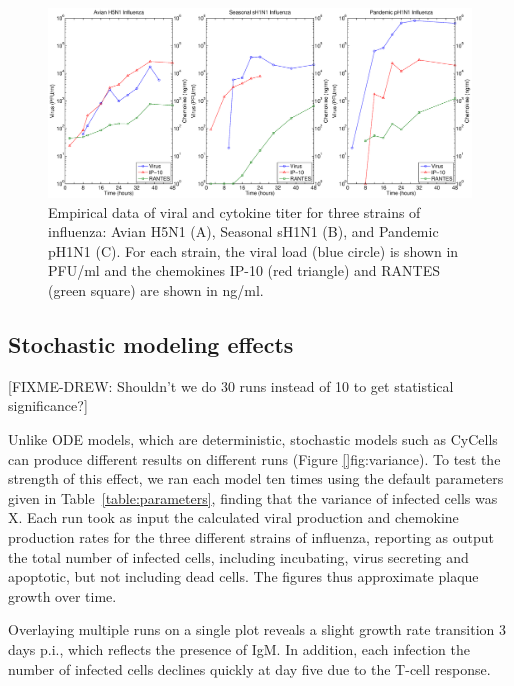 \documentclass[10pt]{article}
\begin{document}
\begin{figure}[ht!]
\begin{center}
 \includegraphics[width=.9\textwidth]{data}
 \end{center}
\caption{Empirical data of viral and cytokine titer for three strains of influenza: Avian H5N1 (A), Seasonal sH1N1 (B), and Pandemic pH1N1 (C).  For each strain, the viral load (blue circle) is shown in PFU/ml and the chemokines IP-10 (red triangle) and RANTES (green square) are shown in ng/ml.} 
 \label{fig:data}
\end{figure}

\subsection*{Stochastic modeling effects}

[FIXME-DREW: Shouldn't we do 30 runs instead of 10 to get statistical significance?]

Unlike ODE models, which are deterministic, stochastic models such as CyCells can produce different results on different runs (Figure \ref{}fig:variance).  To test the strength of this effect, we ran each model ten times using the default parameters given in Table~\ref{table:parameters}, finding that the variance of infected cells was X.  Each run took as input the calculated viral production and chemokine production rates for the three different strains of influenza, reporting as output the total number of infected cells, including incubating, virus secreting and apoptotic, but not including dead cells.  The figures thus approximate plaque growth over time.

Overlaying multiple runs on a single plot reveals a slight growth rate transition 3 days p.i., which reflects the presence of IgM.
In addition, each infection the number of infected cells declines quickly at day five due to the T-cell response. 
\end{document}
